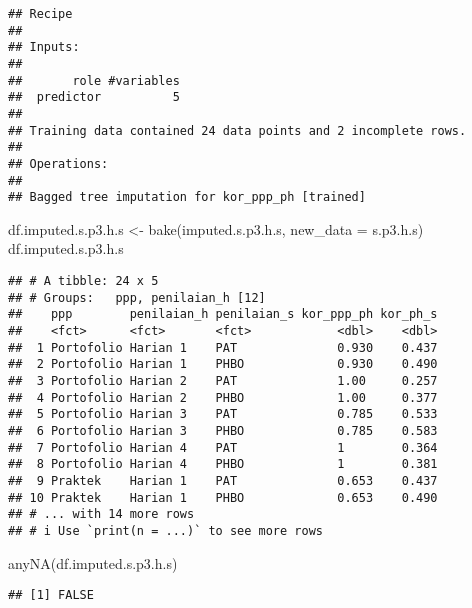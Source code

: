 \documentclass[
]{article}
\newenvironment{Shaded}{\begin{snugshade}}{\end{snugshade}}
\newcommand{\AttributeTok}[1]{\textcolor[rgb]{0.77,0.63,0.00}{#1}}
\newcommand{\FunctionTok}[1]{\textcolor[rgb]{0.00,0.00,0.00}{#1}}
\newcommand{\NormalTok}[1]{#1}
\newcommand{\OtherTok}[1]{\textcolor[rgb]{0.56,0.35,0.01}{#1}}
\begin{document}
\begin{verbatim}
## Recipe
## 
## Inputs:
## 
##       role #variables
##  predictor          5
## 
## Training data contained 24 data points and 2 incomplete rows. 
## 
## Operations:
## 
## Bagged tree imputation for kor_ppp_ph [trained]
\end{verbatim}

\begin{Shaded}
\begin{Highlighting}[]
\NormalTok{df.imputed.s.p3.h.s }\OtherTok{\textless{}{-}}
  \FunctionTok{bake}\NormalTok{(imputed.s.p3.h.s, }\AttributeTok{new\_data =}\NormalTok{ s.p3.h.s) }
\NormalTok{df.imputed.s.p3.h.s}
\end{Highlighting}
\end{Shaded}

\begin{verbatim}
## # A tibble: 24 x 5
## # Groups:   ppp, penilaian_h [12]
##    ppp        penilaian_h penilaian_s kor_ppp_ph kor_ph_s
##    <fct>      <fct>       <fct>            <dbl>    <dbl>
##  1 Portofolio Harian 1    PAT              0.930    0.437
##  2 Portofolio Harian 1    PHBO             0.930    0.490
##  3 Portofolio Harian 2    PAT              1.00     0.257
##  4 Portofolio Harian 2    PHBO             1.00     0.377
##  5 Portofolio Harian 3    PAT              0.785    0.533
##  6 Portofolio Harian 3    PHBO             0.785    0.583
##  7 Portofolio Harian 4    PAT              1        0.364
##  8 Portofolio Harian 4    PHBO             1        0.381
##  9 Praktek    Harian 1    PAT              0.653    0.437
## 10 Praktek    Harian 1    PHBO             0.653    0.490
## # ... with 14 more rows
## # i Use `print(n = ...)` to see more rows
\end{verbatim}

\begin{Shaded}
\begin{Highlighting}[]
\FunctionTok{anyNA}\NormalTok{(df.imputed.s.p3.h.s)}
\end{Highlighting}
\end{Shaded}

\begin{verbatim}
## [1] FALSE
\end{verbatim}
\end{document}
